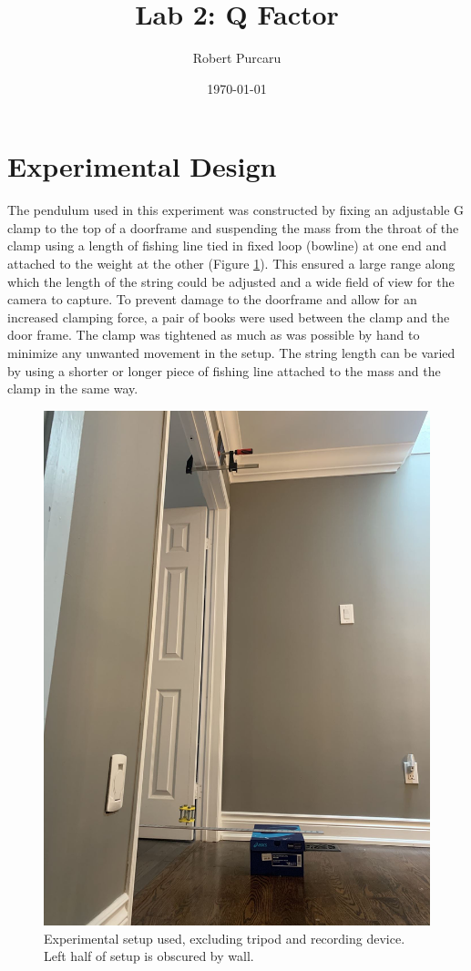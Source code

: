 \documentclass[11pt]{article}
\begin{document}
    \title{Lab 2: Q Factor}
        \author{Robert Purcaru}
        \date{\today}
    \maketitle

    \tableofcontents

    \section{Experimental Design}
        The pendulum used in this experiment was constructed by fixing an adjustable G clamp to the top of a doorframe and suspending the mass from the throat of the clamp using a length of fishing line tied in fixed loop (bowline) at one end and attached to the weight at the other (Figure \ref{fig:setup}). This ensured a large range along which the length of the string could be adjusted and a wide field of view for the camera to capture. To prevent damage to the doorframe and allow for an increased clamping force, a pair of books were used between the clamp and the door frame. The clamp was tightened as much as was possible by hand to minimize any unwanted movement in the setup. The string length can be varied by using a shorter or longer piece of fishing line attached to the mass and the clamp in the same way. 

        \begin{figure}[H]
            \centering\includegraphics[width=.7\linewidth]{setup.jpg}
            \caption{Experimental setup used, excluding tripod and recording device. Left half of setup is obscured by wall.}
            \label{fig:setup}
        \end{figure}
        
\end{document}
